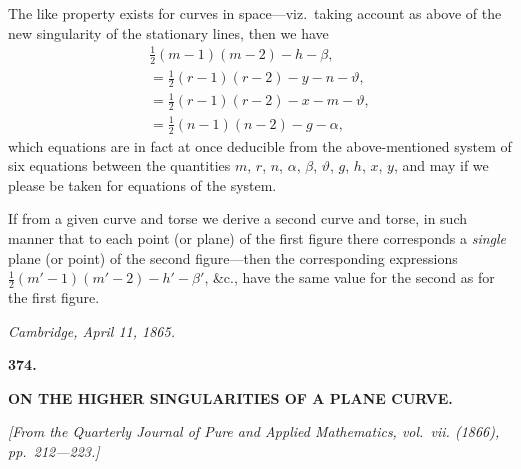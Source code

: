 \documentclass[11pt,a4paper]{article}
\begin{document}
\vspace{12pt}

\noindent
The like property exists for curves in space---viz.~taking account as above of the new singularity of the stationary lines, then we have
\begin{align*}
\tfrac{1}{2}(m - 1)(m - 2) - h - \beta,\\
= \tfrac{1}{2}(r - 1)(r - 2) - y - n - \vartheta,\\
= \tfrac{1}{2}(r - 1)(r - 2) - x - m - \vartheta,\\
= \tfrac{1}{2}(n - 1)(n - 2) - g - \alpha,
\end{align*}
which equations are in fact at once deducible from the above-mentioned system of six equations between the quantities $m$, $r$, $n$, $\alpha$, $\beta$, $\vartheta$, $g$, $h$, $x$, $y$, and may if we please be taken for equations of the system.

If from a given curve and torse we derive a second curve and torse, in such manner that to each point (or plane) of the first figure there corresponds a \textit{single} plane (or point) of the second figure---then the corresponding expressions $\tfrac{1}{2}(m' - 1)(m' - 2) - h' - \beta'$, \&c., have the same value for the second as for the first figure.

\begin{flushright}
\textit{Cambridge, April 11, 1865.}
\end{flushright}

\vspace{24pt}



\newpage
\begin{center}
\textbf{374.}
\end{center}
\vspace{-8pt}

\begin{center}
\textbf{ON THE HIGHER SINGULARITIES OF A PLANE CURVE.}
\end{center}

\begin{flushright}
\small\textit{[From the Quarterly Journal of Pure and Applied Mathematics, vol.~vii. (1866), pp.~212---223.]}
\end{flushright}

\vspace{6pt}
\end{document}
